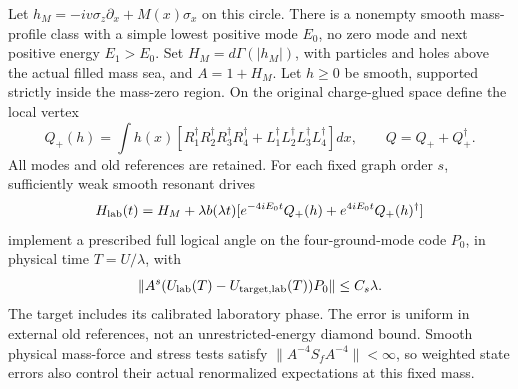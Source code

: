 \begin{proposition}
\label{prop:guarded-mass-gate}
Let $h_M=-iv\sigma_z\partial_x+M(x)\sigma_x$ on this circle.
There is a nonempty smooth mass-profile class with a simple lowest
positive mode $E_0$, no zero mode and next positive energy $E_1>E_0$.
Set $H_M=d\Gamma(|h_M|)$, with particles and holes above the
actual filled mass sea, and $A=1+H_M$. Let $h\ge0$ be smooth,
supported strictly inside the mass-zero region. On the original
charge-glued space define the local vertex
\[
 Q_+(h)=\int h(x)
 [R_1^\dagger R_2^\dagger R_3^\dagger R_4^\dagger+
  L_1^\dagger L_2^\dagger L_3^\dagger L_4^\dagger]dx,
 \qquad Q=Q_++Q_+^\dagger.
\]
All modes and old references are retained. For each fixed graph
order $s$, sufficiently weak smooth resonant drives
\begin{equation}
 H_{\rm lab}(t)=H_M+\lambda b(\lambda t)
 [e^{-4iE_0t}Q_+(h)+e^{4iE_0t}Q_+(h)^\dagger]
 \label{eq:guarded-local-pump}
\end{equation}
implement a prescribed full logical angle on the four-ground-mode
code $P_0$, in physical time $T=U/\lambda$, with
\begin{equation}
 \|A^s(U_{\rm lab}(T)-U_{\rm target,lab}(T))P_0\|
 \le C_s\lambda.
 \label{eq:guarded-full-angle}
\end{equation}
The target includes its calibrated laboratory phase.
The error is uniform in external old references, not an
unrestricted-energy diamond bound. Smooth physical mass-force
and stress tests satisfy
$\|A^{-4}S_fA^{-4}\|<\infty$, so weighted state errors also
control their actual renormalized expectations at this fixed mass.
\end{proposition}
